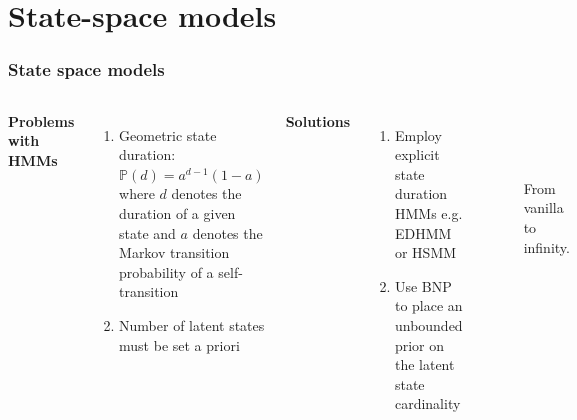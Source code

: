 \documentclass[aspectratio=169]{beamer}
\begin{document}
\section{State-space models}
\begin{frame}
    \frametitle{State space models}

    \begin{columns}
        {\bf Problems with HMMs}
        \begin{enumerate}
            \item Geometric state duration: $\mathbb{P}(d) = a^{d-1} (1-a)$ where $d$ denotes the duration of a given state and $a$ denotes the Markov transition probability of a self-transition
            \item Number of latent states must be set a priori
        \end{enumerate}
        {\bf Solutions}
        \begin{enumerate}
            \item Employ explicit state duration HMMs e.g. EDHMM or HSMM
            \item Use BNP to place an unbounded prior on the latent state cardinality
        \end{enumerate}
        \begin{figure}
            \\
            \\
            \caption{From vanilla to infinity.}
        \end{figure}
    \end{columns}

\end{frame}
\end{document}
